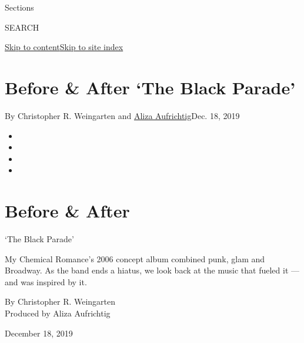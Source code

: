 Sections

SEARCH

\protect\hyperlink{site-content}{Skip to
content}\protect\hyperlink{site-index}{Skip to site index}

\hypertarget{before--after-the-black-parade}{%
\section{Before \& After `The Black
Parade'}\label{before--after-the-black-parade}}

By Christopher R. Weingarten and
\href{https://www.nytimes3xbfgragh.onion/by/aliza-aufrichtig}{Aliza
Aufrichtig}Dec. 18, 2019

\begin{itemize}
\item
\item
\item
\item
\end{itemize}

\hypertarget{before--after}{%
\section{Before \& After}\label{before--after}}

`The Black Parade'

My Chemical Romance's 2006 concept album combined punk, glam and
Broadway. As the band ends a hiatus, we look back at the music that
fueled it --- and was inspired by it.

By Christopher R. Weingarten\\
Produced by Aliza Aufrichtig

December 18, 2019

